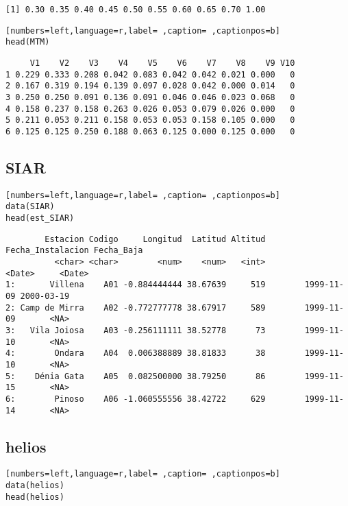 \begin{verbatim}
[1] 0.30 0.35 0.40 0.45 0.50 0.55 0.60 0.65 0.70 1.00
\end{verbatim}


\begin{lstlisting}[numbers=left,language=r,label= ,caption= ,captionpos=b]
head(MTM)
\end{lstlisting}

\begin{verbatim}
     V1    V2    V3    V4    V5    V6    V7    V8    V9 V10
1 0.229 0.333 0.208 0.042 0.083 0.042 0.042 0.021 0.000   0
2 0.167 0.319 0.194 0.139 0.097 0.028 0.042 0.000 0.014   0
3 0.250 0.250 0.091 0.136 0.091 0.046 0.046 0.023 0.068   0
4 0.158 0.237 0.158 0.263 0.026 0.053 0.079 0.026 0.000   0
5 0.211 0.053 0.211 0.158 0.053 0.053 0.158 0.105 0.000   0
6 0.125 0.125 0.250 0.188 0.063 0.125 0.000 0.125 0.000   0
\end{verbatim}

\subsection{SIAR}
\label{sec:orge85bef0}
\begin{lstlisting}[numbers=left,language=r,label= ,caption= ,captionpos=b]
data(SIAR)
head(est_SIAR)
\end{lstlisting}

\begin{verbatim}
        Estacion Codigo     Longitud  Latitud Altitud Fecha_Instalacion Fecha_Baja
          <char> <char>        <num>    <num>   <int>            <Date>     <Date>
1:       Villena    A01 -0.884444444 38.67639     519        1999-11-09 2000-03-19
2: Camp de Mirra    A02 -0.772777778 38.67917     589        1999-11-09       <NA>
3:   Vila Joiosa    A03 -0.256111111 38.52778      73        1999-11-10       <NA>
4:        Ondara    A04  0.006388889 38.81833      38        1999-11-10       <NA>
5:    Dénia Gata    A05  0.082500000 38.79250      86        1999-11-15       <NA>
6:        Pinoso    A06 -1.060555556 38.42722     629        1999-11-14       <NA>
\end{verbatim}

\subsection{helios}
\label{sec:org8c58dcb}
\begin{lstlisting}[numbers=left,language=r,label= ,caption= ,captionpos=b]
data(helios)
head(helios)
\end{lstlisting}

